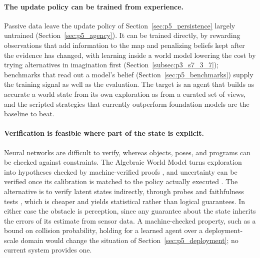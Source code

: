 \paragraph{The update policy can be trained from experience.}
Passive data leave the update policy of Section~\ref{sec:p5_persistence} largely untrained (Section~\ref{sec:p5_agency}).
It can be trained directly, by rewarding observations that add information to the map and penalizing beliefs kept after the evidence has changed, with learning inside a world model lowering the cost by trying alternatives in imagination first (Section~\ref{subsec:p3_s7_3_7}); benchmarks that read out a model's belief (Section~\ref{sec:p5_benchmarks}) supply the training signal as well as the evaluation.
The target is an agent that builds as accurate a world state from its own exploration as from a curated set of views, and the scripted strategies that currently outperform foundation models \cite{zhang2026theory} are the baseline to beat.

\paragraph{Verification is feasible where part of the state is explicit.}
Neural networks are difficult to verify, whereas objects, poses, and programs can be checked against constraints.
The Algebraic World Model turns exploration into hypotheses checked by machine-verified proofs \cite{pan2026algebraic}, and uncertainty can be verified once its calibration is matched to the policy actually executed \cite{mittal2026calibrated}.
The alternative is to verify latent states indirectly, through probes and faithfulness tests \cite{gonzalezlaiz2026limits}, which is cheaper and yields statistical rather than logical guarantees.
In either case the obstacle is perception, since any guarantee about the state inherits the errors of its estimate from sensor data.
A machine-checked property, such as a bound on collision probability, holding for a learned agent over a deployment-scale domain would change the situation of Section~\ref{sec:p5_deployment}; no current system provides one.


